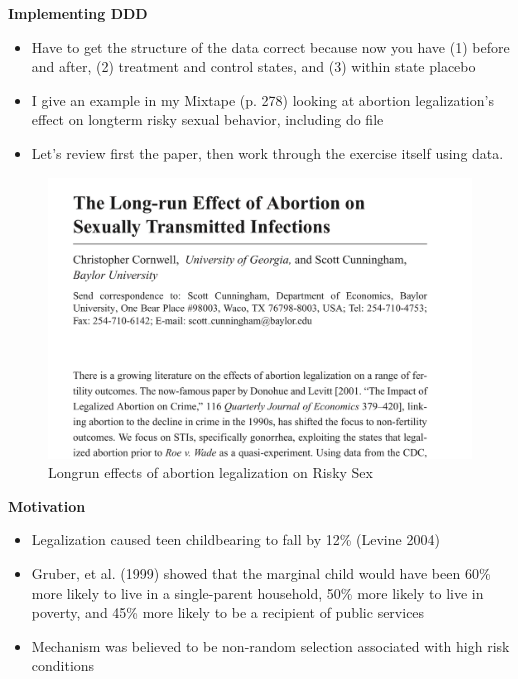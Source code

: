 \documentclass[notes=show]{beamer}
\begin{document}
\begin{frame}[plain]
\begin{center}
\textbf{Implementing DDD}
\end{center}

	\begin{itemize}
	\item Have to get the structure of the data correct because now you have (1) before and after, (2) treatment and control states, and (3) within state placebo
	\item I give an example in my Mixtape (p. 278) looking at abortion legalization's effect on longterm risky sexual behavior, including do file
	\item Let's review first the paper, then work through the exercise itself using data.
	\end{itemize}
	
\end{frame}

\begin{frame}[plain]


\begin{figure}
	\includegraphics[scale=0.15]{./lecture_includes/aler.png}
	\caption{Longrun effects of abortion legalization on Risky Sex}
	\end{figure}

\end{frame}


\begin{frame}[plain]
\begin{center}
\textbf{Motivation}
\end{center}

\begin{itemize}
	\item Legalization caused teen childbearing to fall by 12\% (Levine 2004)
	\item Gruber, et al. (1999) showed that the marginal child would have been 60\% more likely to live in a single-parent household, 50\% more likely to live in poverty, and 45\% more likely to be a recipient of public services
	\item Mechanism was believed to be non-random selection associated with high risk conditions
\end{itemize}

\end{frame}
\end{document}
